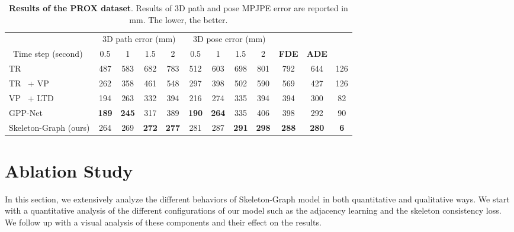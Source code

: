 \documentclass[10pt,twocolumn,letterpaper]{article}
\newcommand*{\ours}{Skeleton-Graph }
\begin{document}
\begin{table*}[ht]
\centering
\scriptsize
\begin{tabular}{lccccccccccc} 
\toprule
                       & \multicolumn{4}{c}{3D path error (mm)}                    & \multicolumn{4}{c}{3D pose error (mm)} & \multicolumn{3}{c}{}                                                 \\
~Time step (second)    & 0.5          & 1            & 1.5          & 2            & 0.5          & 1            & 1.5          & 2            & \textbf{FDE}  & \textbf{ADE} &     \\ 
\midrule
TR~\cite{vaswani2017attention}                        & 487          & 583          & 682          & 783          & 512          & 603          & 698          & 801          & 792  &644    &126                  \\
TR~\cite{vaswani2017attention} + VP~\cite{pavllo20193d}                & 262          & 358          & 461          & 548          & 297          & 398          & 502          & 590          & 569   &427      &126               \\
VP~\cite{pavllo20193d} + LTD~\cite{wei2019motion}              & 194          & 263          & 332          & 394          & 216          & 274          & 335          & 394 & 394    &300   &82                 \\
GPP-Net~\cite{cao2020long}                 & \textbf{189} & \textbf{245} & 317 & 389 & \textbf{190} & \textbf{264} & 335 & 406          & 398  &292  &90           \\ 
\midrule
\ours (ours) & 264          & 269          & \textbf{272}          & \textbf{277}          & 281          & 287          & \textbf{291}          & \textbf{298}          & \textbf{288}  &\textbf{280}  &\textbf{6}                    \\
\bottomrule
\end{tabular}
\caption{  {\bf Results of the PROX dataset}. Results of 3D path and pose MPJPE error are reported in mm. The lower, the better. }
\label{tab:prox_all}
\end{table*}
\section{Ablation Study}
In this section, we extensively analyze the different behaviors of \ours model in both quantitative and qualitative ways. We start with a quantitative analysis of the different configurations of our model such as the adjacency learning and the skeleton consistency loss. We follow up with a visual analysis of these components and their effect on the results.
\end{document}

